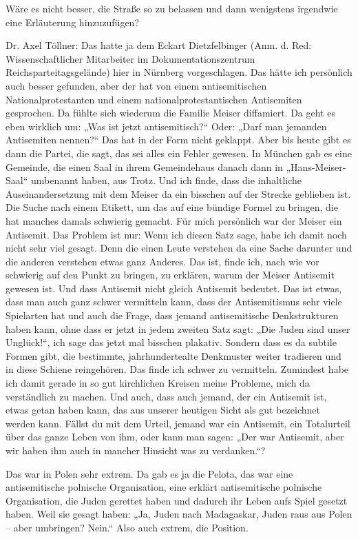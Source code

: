  
Wäre es nicht besser, die Straße so zu belassen und dann wenigstens irgendwie eine Erläuterung hinzuzufügen? 

 
Dr. Axel Töllner: Das hatte ja dem Eckart Dietzfelbinger (Anm. d. Red: Wissenschaftlicher Mitarbeiter im Dokumentationszentrum Reichsparteitagsgelände) hier in Nürnberg vorgeschlagen. Das hätte ich persönlich auch besser gefunden, aber der hat von einem antisemitischen Nationalprotestanten und einem nationalprotestantischen Antisemiten gesprochen. Da fühlte sich wiederum die Familie Meiser diffamiert. Da geht es eben wirklich um: „Was ist jetzt antisemitisch?“ Oder: „Darf man jemanden Antisemiten nennen?“ Das hat in der Form nicht geklappt. Aber bis heute gibt es dann die Partei, die sagt, das sei alles ein Fehler gewesen. In München gab es eine Gemeinde, die einen Saal in ihrem Gemeindehaus danach dann in „Hans-Meiser-Saal“ umbenannt haben, aus Trotz. Und ich finde, dass die inhaltliche Auseinandersetzung mit dem Meiser da ein bisschen auf der Strecke geblieben ist. Die Suche nach einem Etikett, um das auf eine bündige Formel zu bringen, die hat manches damals schwierig gemacht. Für mich persönlich war der Meiser ein Antisemit. 
Das Problem ist nur: Wenn ich diesen Satz sage, habe ich damit noch nicht sehr viel gesagt. Denn die einen Leute verstehen da eine Sache darunter und die anderen verstehen etwas ganz Anderes. Das ist, finde ich, nach wie vor schwierig auf den Punkt zu bringen, zu erklären, warum der Meiser Antisemit gewesen ist. Und dass Antisemit nicht gleich Antisemit bedeutet. Das ist etwas, dass man auch ganz schwer vermitteln kann, dass der Antisemitismus sehr viele Spielarten hat und auch die Frage, dass jemand antisemitische Denkstrukturen haben kann, ohne dass er jetzt in jedem zweiten Satz sagt: „Die Juden sind unser Unglück!“, ich sage das jetzt mal bisschen plakativ. Sondern dass es da subtile Formen gibt, die bestimmte, jahrhundertealte Denkmuster weiter tradieren und in diese Schiene reingehören. Das finde ich schwer zu vermitteln. Zumindest habe ich damit gerade in so gut kirchlichen Kreisen meine Probleme, mich da verständlich zu machen. Und auch, dass auch jemand, der ein Antisemit ist, etwas getan haben kann, das aus unserer heutigen Sicht als gut bezeichnet werden kann. Fällst du mit dem Urteil, jemand war ein Antisemit, ein Totalurteil über das ganze Leben von ihm, oder kann man sagen: „Der war Antisemit, aber wir haben ihm auch in mancher Hinsicht was zu verdanken.“? 
 

Das war in Polen sehr extrem. Da gab es ja die Pelota, das war eine antisemitische polnische Organisation, eine erklärt antisemitische polnische Organisation, die Juden gerettet haben und dadurch ihr Leben aufs Spiel gesetzt haben. Weil sie gesagt haben: „Ja, Juden nach Madagaskar, Juden raus aus Polen – aber umbringen? Nein.“ Also auch extrem, die Position. 

